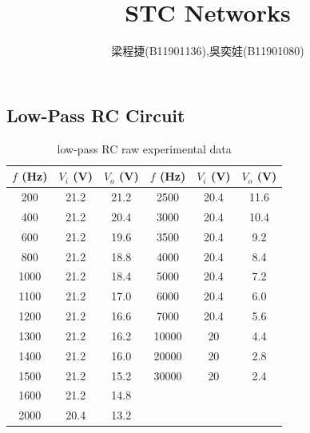 \documentclass{article}
\title{STC Networks}
\author{梁程捷(B11901136),吳奕娃(B11901080)}
\date{}
\begin{document}
\begin{CJK*}{UTF8}{bkai}
\maketitle

\section*{Low-Pass RC Circuit}
\begin{minipage}{0.5\textwidth}
\begin{table}[H]
\begin{tabular}{|c|c|c||c|c|c|}
    \hline
    $f$ (\unit{\hertz}) &  $V_i$ (V)& $V_o$ (V) & $f$ (\unit{\hertz}) &  $V_i$ (V)& $V_o$ (V)\\
    \hline\hline
    200	 & 21.2 & 21.2 & 2500 & 20.4 & 11.6  \\
    400  & 21.2 & 20.4  & 3000  & 20.4 & 10.4\\
    600	& 21.2 & 19.6 & 3500 & 20.4 & 9.2\\
    800	& 21.2 & 18.8 & 4000 & 20.4& 8.4\\
    1000& 21.2 & 18.4 & 5000 & 20.4 & 7.2\\
    1100& 21.2 & 17.0 & 6000 & 20.4 & 6.0\\
    1200& 21.2 & 16.6 & 7000& 20.4 & 5.6\\
    1300 & 21.2 & 16.2 & 10000& 20 & 4.4\\
    1400 & 21.2	 & 16.0 & 20000& 20 & 2.8\\
    1500 & 21.2	& 15.2 & 30000 & 20 & 2.4\\
    1600 & 21.2 & 14.8 &  &  & \\
    2000 & 20.4	& 13.2 &  &  & \\
 \hline
\end{tabular}
\caption{low-pass RC raw experimental data}
\end{table}
\end{minipage}\hspace{20mm}
\begin{minipage}{0.5\textwidth}
\begin{figure}[H]
   

\end{figure}
\end{minipage}
\end{CJK*}
\end{document}
